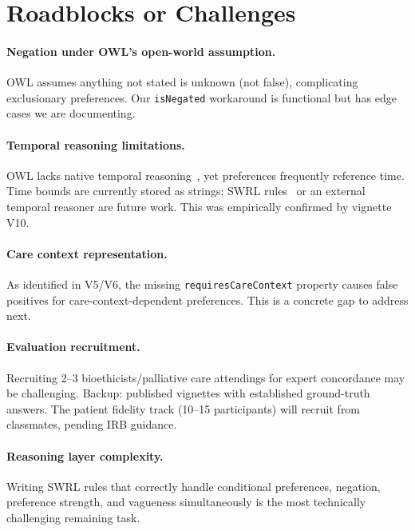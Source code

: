 \documentclass[11pt]{article}
\newcommand{\onto}[1]{\texttt{#1}}
\begin{document}
\section{Roadblocks or Challenges}

\paragraph{Negation under OWL's open-world assumption.}
OWL assumes anything not stated is unknown (not false), complicating exclusionary preferences. Our \onto{isNegated} workaround is functional but has edge cases we are documenting.

\paragraph{Temporal reasoning limitations.}
OWL lacks native temporal reasoning~\cite{owl2primer}, yet preferences frequently reference time. Time bounds are currently stored as strings; SWRL rules~\cite{swrl} or an external temporal reasoner are future work. This was empirically confirmed by vignette V10.

\paragraph{Care context representation.}
As identified in V5/V6, the missing \onto{requiresCareContext} property causes false positives for care-context-dependent preferences. This is a concrete gap to address next.

\paragraph{Evaluation recruitment.}
Recruiting 2--3 bioethicists/palliative care attendings for expert concordance may be challenging. Backup: published vignettes with established ground-truth answers. The patient fidelity track (10--15 participants) will recruit from classmates, pending IRB guidance.

\paragraph{Reasoning layer complexity.}
Writing SWRL rules that correctly handle conditional preferences, negation, preference strength, and vagueness simultaneously is the most technically challenging remaining task.
\end{document}
